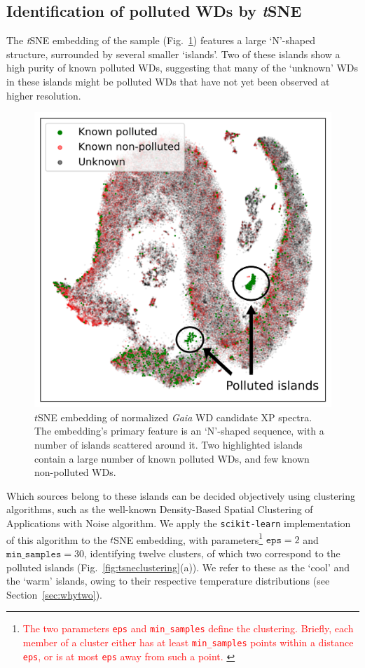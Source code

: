 \documentclass[fleqn,usenatbib]{rasti}
\newcommand{\red}[1]{\textcolor{red}{#1}}
\begin{document}
\subsection{Identification of polluted WDs by \textit{t}SNE} \label{sec:results/tsne}

The \textit{t}SNE embedding of the sample (Fig.~\ref{fig:tsneembedding}) features a large `N'-shaped structure, surrounded by several smaller `islands'.
Two of these islands show a high purity of known polluted WDs, suggesting that many of the `unknown' WDs in these islands might be polluted WDs that have not yet been observed at higher resolution.

\begin{figure}
\centering
\includegraphics[width=\columnwidth]{figures/fig1_tsneembedding.png}
\caption{
    $t$SNE embedding of normalized \textit{Gaia} WD candidate XP spectra.
    The embedding's primary feature is an `N'-shaped sequence, with a number of islands scattered around it.
    Two highlighted islands contain a large number of known polluted WDs, and few known non-polluted WDs.
}
\label{fig:tsneembedding}
\end{figure}

Which sources belong to these islands can be decided objectively using clustering algorithms, such as the well-known Density-Based Spatial Clustering of Applications with Noise \citep[DBSCAN;][]{ester96} algorithm.
We apply the \texttt{scikit-learn} implementation of this algorithm to the $t$SNE embedding, with parameters\footnote{
    \red{
        The two parameters \texttt{eps} and \texttt{min\_samples} define the clustering.
        Briefly, each member of a cluster either has at least \texttt{min\_samples} points within a distance \texttt{eps}, or is at most \texttt{eps} away from such a point.
    }
} $\mathtt{eps}=2$ and $\mathtt{min\_samples}=30$, identifying twelve clusters, of which two correspond to the polluted islands (Fig.~\ref{fig:tsneclustering}(a)).
We refer to these as the `cool' and the `warm' islands, owing to their respective temperature distributions (see Section~\ref{sec:whytwo}).
\end{document}
